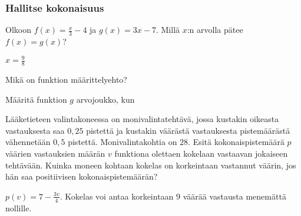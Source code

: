 \begin{tehtavasivu}
\subsubsection*{Hallitse kokonaisuus}

\begin{tehtava}
  Olkoon $f(x)=\frac{x}{3}-4$ ja $g(x)=3x-7$. Millä $x$:n arvolla pätee $ f(x)=g(x)$?
  \begin{vastaus}
$x=\frac{9}{8}$
  \end{vastaus}
\end{tehtava}

\begin{tehtava}
  Mikä on funktion määrittelyehto?
  \begin{vastaus}
  \end{vastaus}
\end{tehtava}

\begin{tehtava}
	Määritä funktion $g$ arvojoukko, kun
	\begin{vastaus}
	\alakohdatm{
	§ $\mathbb{R}$
	§ $\mathbb{R}$ $\setminus \lbrace 0 \rbrace$
	§ $\mathbb{R}_+$ (tai $\mathbb{R}_{\geq 0}$ tai $[0, \infty [$)
	§ $\mathbb{R}$
	}
	\end{vastaus}
\end{tehtava}

\begin{tehtava}
	Lääketieteen valintakoneessa on monivalintatehtävä, jossa kustakin oikeasta vastauksesta saa $0,25$ pistettä ja kustakin väärästä vastauksesta pistemäärästä vähennetään $0,5$ pistettä. Monivalintakohtia on $28$. Esitä kokonaispistemäärä $p$ väärien vastauksien määrän $v$ funktiona olettaen kokelaan vastaavan jokaiseen tehtävään. Kuinka moneen kohtaan kokelas on korkeintaan vastannut väärin, jos hän saa positiivisen kokonaispistemäärän?
	\begin{vastaus}
		$p(v) = 7-\frac{3v}{4}$. Kokelas voi antaa korkeintaan $9$ väärää vastausta menemättä nollille.
	\end{vastaus}
\end{tehtava}



\end{tehtavasivu}
